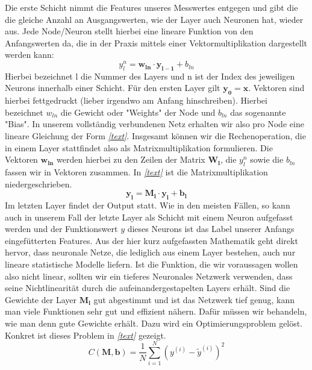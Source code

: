 Die erste Schicht nimmt die Features unseres Messwertes entgegen und gibt die die gleiche Anzahl an Ausgangswerten, wie der Layer auch Neuronen hat, wieder aus. Jede Node/Neuron stellt hierbei eine lineare Funktion von den Anfangswerten da, die in der Praxis mittels einer Vektormultiplikation dargestellt werden kann:
\begin{equation}
	y_l^n = \mathbf{w_{ln}} \cdot \mathbf{y_{l-1}} + b_{ln}
\end{equation}
Hierbei bezeichnet l die Nummer des Layers und n ist der Index des jeweiligen Neurons innerhalb einer Schicht. Für den ersten Layer gilt $\mathbf{y_0} = \mathbf{x}$. Vektoren sind hierbei fettgedruckt (lieber irgendwo am Anfang hinschreiben). Hierbei bezeichnet $w_{ln}$ die Gewicht oder "Weights" der Node und $b_{ln}$ das sogenannte "Bias". In unserem vollständig verbundenen Netz erhalten wir also pro Node eine lineare Gleichung der Form \textit{\autoref{text}}. Insgesamt können wir die Rechenoperation, die in einem Layer stattfindet also als Matrixmultiplikation formulieren. Die Vektoren $\mathbf{w_{ln}}$ werden hierbei zu den Zeilen der Matrix $\mathbf{W_l}$, die $y_l^n$ sowie die $b_{ln}$ fassen wir in Vektoren zusammen. In \textit{\autoref{text}} ist die Matrixmultiplikation niedergeschrieben.
\begin{equation}
	\mathbf{y_l} = \mathbf{M_l}\cdot \mathbf{y_l} + \mathbf{b_l} 
\end{equation}
Im letzten Layer findet der Output statt. Wie in den meisten Fällen, so kann auch in unserem Fall der letzte Layer als Schicht mit einem Neuron aufgefasst werden und der Funktionswert $y$ dieses Neurons ist das Label unserer Anfangs eingefütterten Features. Aus der hier kurz aufgefassten Mathematik geht direkt hervor, dass neuronale Netze, die lediglich aus einem Layer bestehen, auch nur lineare statistische Modelle liefern. Ist die Funktion, die wir voraussagen wollen also nicht linear, sollten wir ein tieferes Neuronales Netzwerk verwenden, dass seine Nichtlinearität durch die aufeinandergestapelten Layers erhält. Sind die Gewichte der Layer $\mathbf{M_l}$ gut abgestimmt und ist das Netzwerk tief genug, kann man viele Funktionen sehr gut und effizient nähern. Dafür müssen wir behandeln, wie man denn gute Gewichte erhält. Dazu wird ein Optimierungsproblem gelöst. Konkret ist dieses Problem in \textit{\autoref{text}} gezeigt.
\begin{equation}
	C\left(\mathbf{M}, \mathbf{b}\right) = \frac{1}{N}\sum_{i=1}^{N}\left(y^{(i)} - \tilde{y}^{(i)}\right)^2
\end{equation}

